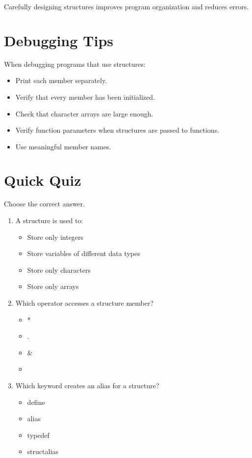 \documentclass[12pt,openany]{book}
\begin{document}
Carefully designing structures improves program organization and reduces errors.

\section{Debugging Tips}

When debugging programs that use structures:

\begin{itemize}
    \item Print each member separately.
    \item Verify that every member has been initialized.
    \item Check that character arrays are large enough.
    \item Verify function parameters when structures are passed to functions.
    \item Use meaningful member names.
\end{itemize}

\section{Quick Quiz}

Choose the correct answer.

\begin{enumerate}
    \item A structure is used to:
    \begin{itemize}
        \item Store only integers
        \item Store variables of different data types
        \item Store only characters
        \item Store only arrays
    \end{itemize}

    \item Which operator accesses a structure member?
    \begin{itemize}
        \item *
        \item .
        \item &
        \item %
    \end{itemize}

    \item Which keyword creates an alias for a structure?
    \begin{itemize}
        \item define
        \item alias
        \item typedef
        \item structalias
    \end{itemize}
\end{enumerate}
\end{document}
